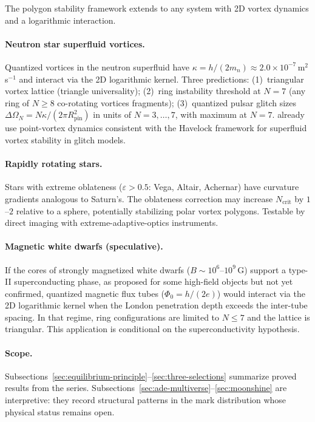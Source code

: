 The polygon stability framework extends to any system
with 2D vortex dynamics and a logarithmic interaction.

\paragraph{Neutron star superfluid vortices.}
Quantized vortices in the neutron superfluid have
$\kappa = h/(2m_n) \approx 2.0 \times 10^{-7}$\,m$^2$\,s$^{-1}$
and interact via the 2D logarithmic kernel.
Three predictions:
(1)~triangular vortex lattice (triangle universality);
(2)~ring instability threshold at $N = 7$ (any ring of $N \ge 8$
co-rotating vortices fragments);
(3)~quantized pulsar glitch sizes
$\Delta\Omega_N = N\kappa/(2\pi R_{\mathrm{pin}}^2)$
in units of $N = 3, \ldots, 7$, with maximum at $N = 7$.
\citet{Howitt2020} already use point-vortex dynamics consistent with the Havelock framework
for superfluid vortex stability in glitch models.

\paragraph{Rapidly rotating stars.}
Stars with extreme oblateness ($\varepsilon > 0.5$:
Vega, Altair, Achernar) have curvature gradients
analogous to Saturn's.
The oblateness correction may increase $N_{\mathrm{crit}}$
by $1$--$2$ relative to a sphere,
potentially stabilizing polar vortex polygons.
Testable by direct imaging with
extreme-adaptive-optics instruments.

\paragraph{Magnetic white dwarfs (speculative).}
If the cores of strongly magnetized white dwarfs
($B \sim 10^6$--$10^9$\,G) support a type-II
superconducting phase, as proposed for some
high-field objects but not yet confirmed, quantized
magnetic flux tubes ($\Phi_0 = h/(2e)$) would interact
via the 2D logarithmic kernel when the London penetration
depth exceeds the inter-tube spacing.
In that regime, ring configurations are limited to
$N \le 7$ and the lattice is triangular.
This application is conditional on the
superconductivity hypothesis.

\paragraph{Scope.}
Subsections~\ref{sec:equilibrium-principle}--\ref{sec:three-selections}
summarize proved results from the series.
Subsections~\ref{sec:ade-multiverse}--\ref{sec:moonshine} are
interpretive: they record structural patterns in the mark distribution
whose physical status remains open.

